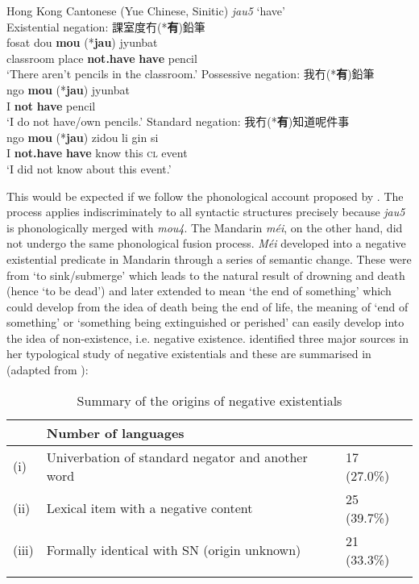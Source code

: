 \documentclass[output=paper]{langscibook}
\begin{document}
\ea Hong Kong Cantonese (Yue Chinese, Sinitic) \textit{jau5} `have' \label{ex:lam32}\\
  \ea Existential negation: {\cn 課室度冇(*\textbf{有})鉛筆} \label{ex:lam32a}\\
  	\gll fosat dou \textbf{mou} (*\textbf{jau}) jyunbat\\
  	classroom	place	\textbf{not.have}	\textbf{have}	pencil\\
  	\glt `There aren't pencils in the classroom.'
  \ex Possessive negation: {\cn 我冇(*\textbf{有})鉛筆} \label{ex:lam32b}\\
  	\gll ngo	 \textbf{mou}	 (*\textbf{jau}) jyunbat\\
  	I \textbf{not} \textbf{have} pencil\\
  	\glt `I do not have/own pencils.'
  \ex Standard negation: {\cn 我冇(*\textbf{有})知道呢件事} \label{ex:lam32c}\\
  	\gll ngo	 \textbf{mou} (*\textbf{jau}) zidou li gin si\\
  	I \textbf{not.have} \textbf{have} know this	\textsc{cl}	event\\
  	\glt `I did not know about this event.'
\z \z

This would be expected if we follow the phonological account proposed by \citeauthor{Law2014}. The process applies indiscriminately to all syntactic structures precisely because \textit{jau5} is phonologically merged with \textit{mou4}. The Mandarin \textit{méi}, on the other hand, did not undergo the same phonological fusion process. \textit{Méi} developed into a negative existential predicate in Mandarin through a series of semantic change. These were from `to sink/submerge' which leads to the natural result of drowning and death (hence `to be dead') and later extended to mean `the end of something' which could develop from the idea of death being the end of life, the meaning of `end of something' or `something being extinguished or perished' can easily develop into the idea of non-existence, i.e. negative existence. \cite{Veselinova2013} identified three major sources in her typological study of negative existentials and these are summarised in  (adapted from \citealt[Table 7]{Veselinova2013}):

\begin{table}
  \begin{tabularx}{\textwidth}{llY}
    \lsptoprule
     & Number of languages\\
     \midrule
(i)	& Univerbation of standard negator and another word & 17 (27.0\%)\\
(ii) & Lexical item with a negative content & 25 (39.7\%)\\
(iii) & Formally identical with SN (origin unknown) & 21 (33.3\%)\\
\lspbottomrule
\end{tabularx}
  \caption{Summary of the origins of negative existentials}
  \label{tab:lam9}
\end{table}
\end{document}
